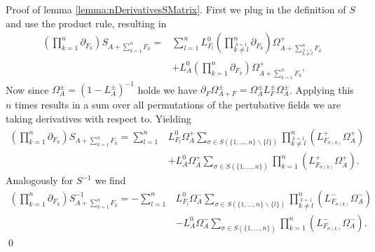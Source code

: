 \documentclass[oneside,reqno,12pt]{amsart}
\begin{document}
\vspace{1cm}
Proof of lemma \ref{lemma:nDerivativesSMatrix}. First we plug in the definition of \(S\) and use the product rule, resulting in
\begin{align}
\left(\prod_{k=1}^n \partial_{F_k} \right) S_{A+\sum_{k=1}^n F_k} 
= &\sum_{l=1}^n L^0_{F_l} \left( \prod_{\stackrel{k=1}{ k\neq l}}^n \partial_{F_k}\right) \Omega^+_{A+\sum_{\stackrel{k=1}{ k\neq l}}^n F_k}\\
&+ L^0_{A} \left( \prod_{k=1}^n \partial_{F_k}\right) \Omega^+_{A+\sum_{k=1}^n F_k},
\end{align}
Now since \(\Omega_A^\pm=(1-L_A^\pm)^{-1}\) holds we have \(\partial_F \Omega_{A+F}^\pm = \Omega^\pm_{A} L^\pm_F \Omega^\pm_A\). 
Applying this \(n\) times results in a sum over all permutations of the pertubative fields we are taking derivatives with respect to. Yielding
\begin{align}\tag*{}
\left(\prod_{k=1}^n \partial_{F_k} \right) S_{A+\sum_{k=1}^n F_k} 
= \sum_{l=1}^n &L^0_{F_l}\Omega^+_A  \sum_{\sigma \in S(\{1,\dots,n\}\backslash\{l\})} \prod_{\stackrel{k=1}{ k\neq l}}^n \left( L^+_{F_{\sigma(k)}} \Omega^+_{A}\right)\\
&+ L^0_{A} \Omega^+_A  \sum_{\sigma \in S(\{1,\dots,n\})} \prod_{k=1}^n \left(L^+_{F_{\sigma(k)}}\Omega^+_{A}\right).
\end{align}
Analogously for \(S^{-1}\) we find
\begin{align}\tag*{}
\left(\prod_{k=1}^n \partial_{F_k} \right) S^{-1}_{A+\sum_{k=1}^n F_k} 
= -\sum_{l=1}^n &L^0_{F_l}\Omega^-_A  \sum_{\sigma \in S(\{1,\dots,n\}\backslash\{l\})} \prod_{\stackrel{k=1}{ k\neq l}}^n \left( L^-_{F_{\sigma(k)}} \Omega^-_{A}\right)\\
&- L^0_{A} \Omega^-_A  \sum_{\sigma \in S(\{1,\dots,n\})} \prod_{k=1}^n \left(L^-_{F_{\sigma(k)}}\Omega^-_{A}\right).
\end{align}
\qed
\end{document}
